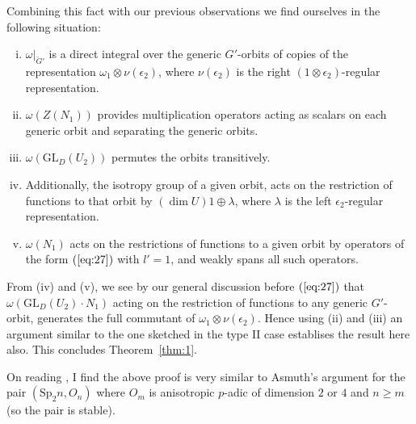 \documentclass[12pt]{amsart}
\def\Sp{{\mathrm{Sp}}}
\def\GL{{\mathrm{GL}}}
\def\cG{{\check{G}}}
\begin{document}
Combining this fact with our previous observations we find ourselves 
in the following situation:
\begin{enumerate}[i)]
\item $\omega|_{\cG'}$ is a direct integral over the generic $G'$-orbits
of copies of the representation $\omega_1\otimes \nu(\epsilon_2)$, 
where $\nu(\epsilon_2)$ 
is the right $(1\otimes \epsilon_2)$-regular representation.
\item $\omega(Z(N_1))$ provides multiplication operators acting as scalars on 
each generic orbit and separating the generic orbits.
\item $\omega(\GL_D(U_2))$ permutes the orbits transitively.
\item Additionally, the isotropy group of a given orbit, 
acts on the restriction of functions to that orbit by $(\dim U)1\oplus\lambda$,
where $\lambda$ is the left $\epsilon_2$-regular representation.
\item $\omega(N_1)$ acts on the restrictions of functions to a given 
orbit by operators of the form $(\ref{eq:27})$ with $l'=1$,
and weakly spans all such operators.  
\end{enumerate}
From (iv) and (v), we see by our general discussion before $(\ref{eq:27})$
that $\omega(\GL_D(U_2)\cdot N_1)$ acting on the restriction of functions to
any generic $G'$-orbit, generates the full commutant of
$\omega_1\otimes \nu(\epsilon_2)$. Hence using (ii) and (iii) 
an argument similar to the one sketched in the type II case
establises the result here also. This concludes Theorem~\ref{thm:1}.

On reading \cite{Asmuth1979}, I find the above proof is very similar to Asmuth's
argument for the pair $(\Sp_2n,O_n)$ where $O_m$ is anisotropic $p$-adic
of dimension $2$ or $4$ and $n\geq m$ (so the pair is stable).



\end{document}
